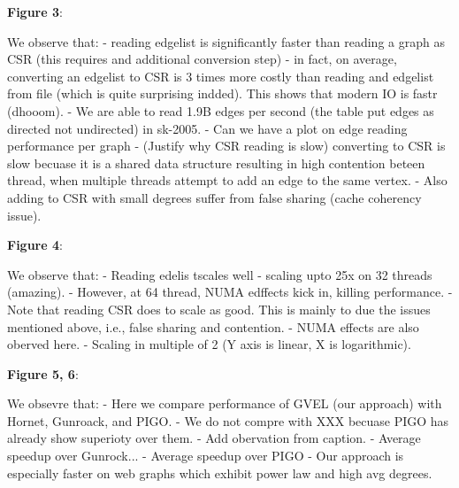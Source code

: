 \textbf{Figure 3}:

We observe that:
- reading edgelist is significantly faster than reading a graph as CSR (this requires and additional conversion step)
- in fact, on average, converting an edgelist to CSR is 3 times more costly than reading and edgelist from file (which is quite surprising indded). This shows that modern IO is fastr (dhooom).
- We are able to read 1.9B edges per second (the table put edges as directed not undirected) in sk-2005.
- Can we have a plot on edge reading performance per graph
- (Justify why CSR reading is slow) converting to CSR is slow becuase it is a shared data structure resulting in high contention beteen thread, when multiple threads attempt to add an edge to the same vertex.
- Also adding to CSR with small degrees suffer from false sharing (cache coherency issue).

\textbf{Figure 4}:

We observe that:
- Reading edelis tscales well - scaling upto 25x on 32 threads (amazing).
- However, at 64 thread, NUMA edffects kick in, killing performance.
- Note that reading CSR does to scale as good. This is mainly to due the issues mentioned above, i.e., false sharing and contention.
- NUMA effects are also oberved here.
- Scaling in multiple of 2 (Y axis is linear, X is logarithmic).

\textbf{Figure 5, 6}:

We obsevre that:
- Here we compare performance of GVEL (our approach) with Hornet, Gunroack, and PIGO.
- We do not compre with XXX becuase PIGO has already show superioty over them.
- Add obervation from caption.
- Average speedup over Gunrock...
- Average speedup over PIGO
- Our approach is especially faster on web graphs which exhibit power law and high avg degrees.
